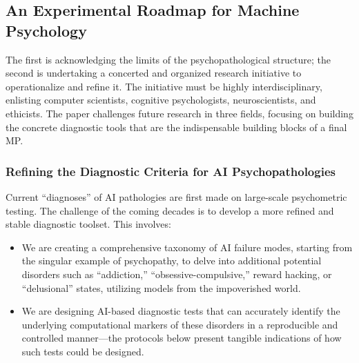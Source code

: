\documentclass{article}
\begin{document}
\subsection{An Experimental Roadmap for Machine Psychology}
The first is acknowledging the limits of the psychopathological structure; the second is undertaking a concerted and organized research initiative to operationalize and refine it. The initiative must be highly interdisciplinary, enlisting computer scientists, cognitive psychologists, neuroscientists, and ethicists. The paper challenges future research in three fields, focusing on building the concrete diagnostic tools that are the indispensable building blocks of a final MP.

\subsubsection{Refining the Diagnostic Criteria for AI Psychopathologies}
Current “diagnoses” of AI pathologies are first made on large-scale psychometric testing. The challenge of the coming decades is to develop a more refined and stable diagnostic toolset. This involves:
\begin{itemize}
    \item We are creating a comprehensive taxonomy of AI failure modes, starting from the singular example of psychopathy, to delve into additional potential disorders such as “addiction,” “obsessive-compulsive,” reward hacking, or “delusional” states, utilizing models from the impoverished world.
    \item We are designing AI-based diagnostic tests that can accurately identify the underlying computational markers of these disorders in a reproducible and controlled manner—the protocols below present tangible indications of how such tests could be designed.
\end{itemize}
\end{document}
